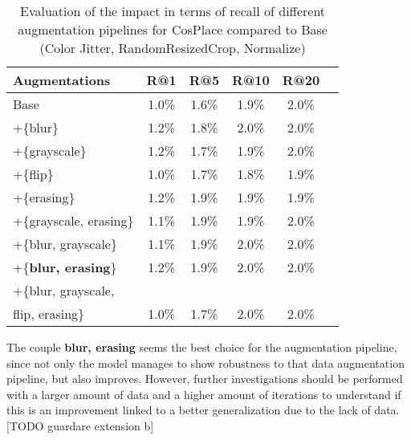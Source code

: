 \documentclass[10pt,twocolumn,letterpaper]{article}
\begin{document}
\begin{table}[hbp] %
\centering %
\begin{tabular}{l c c c c c} %
\toprule %
Augmentations & R@1 & R@5 & R@10 & R@20\\ %
\midrule %
Base & 1.0\%  & 1.6\% & 1.9\% & 2.0\%  \\ 
+\{blur\} & 1.2\%  & 1.8\% & 2.0\% & 2.0\%  \\ 
+\{grayscale\} & 1.2\%  & 1.7\% & 1.9\% & 2.0\%  \\ 
+\{flip\} & 1.0\%  & 1.7\% & 1.8\% & 1.9\%  \\  
+\{erasing\} & 1.2\%  & 1.9\% & 1.9\% & 1.9\%  \\  
+\{grayscale, erasing\} & 1.1\%  & 1.9\% & 1.9\% & 2.0\%  \\  
+\{blur, grayscale\} & 1.1\%  & 1.9\% & 2.0\% & 2.0\%  \\  
+\{\textbf{blur, erasing}\} & 1.2\%  & 1.9\% & 2.0\% & 2.0\%  \\  
+\{blur, grayscale,\\ flip, erasing\} & 1.0\%  & 1.7\% & 2.0\% & 2.0\%  \\  

\bottomrule %
\end{tabular}
\smallskip 
\caption{Evaluation of the impact in terms of recall of different augmentation pipelines for CosPlace compared to Base (Color Jitter, RandomResizedCrop, Normalize)
} %
\label{tab:augmentations-pp} %
\end{table}

The couple \textbf{blur, erasing} seems the best choice for the augmentation pipeline, since not only the model manages to show robustness to that data augmentation pipeline, but also improves.
However, further investigations should be performed with a larger amount of data and a higher amount of iterations to understand if this is an improvement linked to a better generalization due to the lack of data. 
[TODO guardare extension b]
\newline
\end{document}
